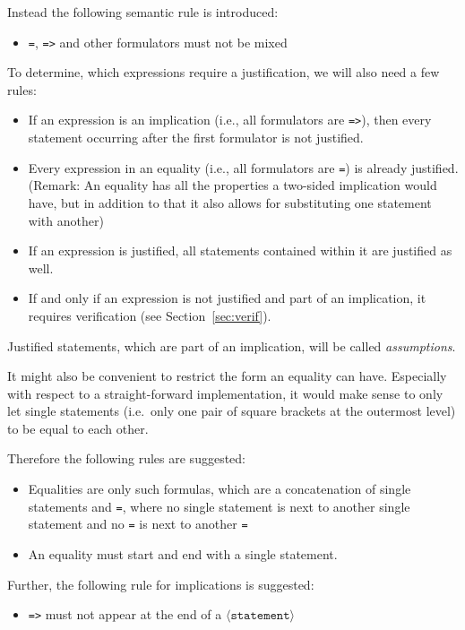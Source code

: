 \documentclass[british]{article}
\newcommand\prv{bc}
\newcommand\m[1]{\texttt{#1}}
\begin{document}
Instead the following semantic rule is introduced:
\begin{itemize}
\item \m{=}, \m{=>} and other formulators must not be mixed
\end{itemize}

\medskip{}

To determine, which expressions require a justification, we will also need a few
rules:
\begin{itemize}
	\item
		If an expression is an implication (i.e., all formulators are \m{=>}),
		then every statement occurring after the first formulator is not
		justified.
	\item
		Every expression in an equality (i.e., all formulators are \m{=}) is
		already justified. (Remark: An equality has all the properties a
		two-sided implication would have, but in addition to that it also allows
		for substituting one statement with another)
	\item
		If an expression is justified, all statements contained within it are
		justified as well.
	\item
		If and only if an expression is not justified and part of an
		implication, it requires verification (see Section~\ref{sec:verif}).
\end{itemize}
Justified statements, which are part of an implication, will be called
\emph{assumptions}.
\medskip{}

It might also be convenient to restrict the form an equality can have.
Especially with respect to a straight-forward implementation, it would
make sense to only let single statements (i.e.\ only one pair of square
brackets at the outermost level) to be equal to each other.\newline

Therefore the following rules are suggested:
\begin{itemize}
	\item
		Equalities are only such formulas, which are a concatenation of single
		statements and \m{=}, where no single statement is next to another
		single statement and no \m{=} is next to another \m{=}
	\item
		An equality must start and end with a single statement.
\end{itemize}
\medskip{}

Further, the following rule for implications is suggested:

\begin{itemize}
\item \m{=>} must not appear at the end of a $\langle\texttt{statement}\rangle$
\end{itemize}
\pagebreak{}
\end{document}
